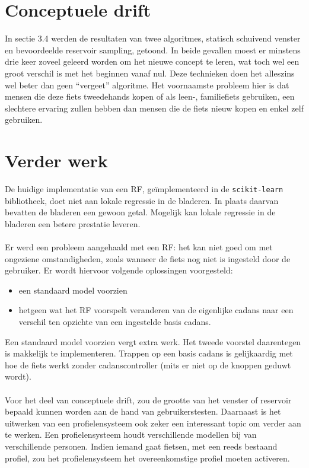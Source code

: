 \section{Conceptuele drift}
In sectie 3.4 werden de resultaten van twee algoritmes, statisch schuivend venster en bevoordeelde reservoir sampling, getoond. In beide gevallen moest er minstens drie keer zoveel geleerd worden om het nieuwe concept te leren, wat toch wel een groot verschil is met het beginnen vanaf nul. Deze technieken doen het alleszins wel beter dan geen “vergeet” algoritme. Het voornaamste probleem hier is dat mensen die deze fiets tweedehands kopen of als leen-, familiefiets gebruiken, een slechtere ervaring zullen hebben dan mensen die de fiets nieuw kopen en enkel zelf gebruiken.
\section{Verder werk}
De huidige implementatie van een RF, geïmplementeerd in de \texttt{scikit-learn} bibliotheek, doet niet aan lokale regressie in de bladeren. In plaats daarvan bevatten de bladeren een gewoon getal. Mogelijk kan lokale regressie in de bladeren een betere prestatie leveren.
\\\\
Er werd een probleem aangehaald met een RF: het kan niet goed om met ongeziene omstandigheden, zoals wanneer de fiets nog niet is ingesteld door de gebruiker. Er wordt hiervoor volgende oplossingen voorgesteld: 

\begin{itemize}
\item een standaard model voorzien
\item hetgeen wat het RF voorspelt veranderen van de eigenlijke cadans naar een verschil ten opzichte van een ingestelde basis cadans.
\end{itemize}

\noindent Een standaard model voorzien vergt extra werk. Het tweede voorstel daarentegen is makkelijk te implementeren. Trappen op een basis cadans is gelijkaardig met hoe de fiets werkt zonder cadanscontroller (mits er niet op de knoppen geduwt wordt).
\\\\
Voor het deel van conceptuele drift, zou de grootte van het venster of reservoir bepaald kunnen worden aan de hand van gebruikerstesten. Daarnaast is het uitwerken van een profielensysteem ook zeker een interessant topic om verder aan te werken. Een profielensysteem houdt verschillende modellen bij van verschillende personen. Indien iemand gaat fietsen, met een reeds bestaand profiel, zou het profielensysteem het overeenkomstige profiel moeten activeren.

